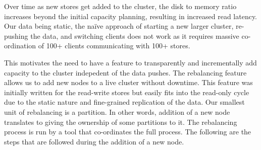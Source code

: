 Over time as new stores get added to the cluster, the disk to memory
ratio increases beyond the initial capacity planning, resulting in
increased read latency. Our data being static, the na\"{i}ve
approach of starting a new larger cluster, re-pushing the data, and
switching clients does not work as it requires massive co-ordination
of 100+ clients communicating with 100+ stores.

This motivates the need to have a feature to transparently and 
incrementally add capacity to the cluster indepedent of the data pushes. 
The rebalancing feature allows us to add new nodes to a live cluster without 
downtime. This feature was initially written for the read-write stores 
but easily fits into the read-only cycle due to the static nature 
and fine-grained replication of the data. Our smallest unit of rebalancing 
is a partition. In other words, addition of a new node translates to giving the ownership 
of some partitions to it. The rebalancing process is run by a tool that 
co-ordinates the full process. The following are the steps that
are followed during the addition of a new node. 

